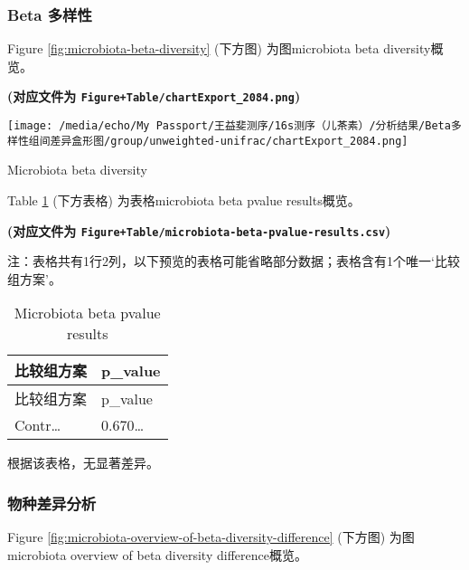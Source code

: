 \documentclass[
]{article}
\begin{document}
\hypertarget{beta-ux591aux6837ux6027}{%
\subsubsection{Beta 多样性}\label{beta-ux591aux6837ux6027}}

Figure \ref{fig:microbiota-beta-diversity} (下方图) 为图microbiota beta diversity概览。

\textbf{(对应文件为 \texttt{Figure+Table/chartExport\_2084.png})}

\def\@captype{figure}
\begin{center}
\texttt{[image: /media/echo/My Passport/王益斐测序/16s测序（儿茶素）/分析结果/Beta多样性组间差异盒形图/group/unweighted-unifrac/chartExport\_2084.png]}
\caption{Microbiota beta diversity}\label{fig:microbiota-beta-diversity}
\end{center}

Table \ref{tab:microbiota-beta-pvalue-results} (下方表格) 为表格microbiota beta pvalue results概览。

\textbf{(对应文件为 \texttt{Figure+Table/microbiota-beta-pvalue-results.csv})}

\begin{center}\begin{tcolorbox}[colback=gray!10, colframe=gray!50, width=0.9\linewidth, arc=1mm, boxrule=0.5pt]注：表格共有1行2列，以下预览的表格可能省略部分数据；表格含有1个唯一`比较组方案'。
\end{tcolorbox}
\end{center}

\begin{longtable}[]{@{}ll@{}}
\caption{\label{tab:microbiota-beta-pvalue-results}Microbiota beta pvalue results}\tabularnewline
\toprule
比较组方案 & p\_value\tabularnewline
\midrule
\endfirsthead
\toprule
比较组方案 & p\_value\tabularnewline
\midrule
\endhead
Contr\ldots{} & 0.670\ldots{}\tabularnewline
\bottomrule
\end{longtable}

根据该表格，无显著差异。

\hypertarget{ux7269ux79cdux5deeux5f02ux5206ux6790}{%
\subsubsection{物种差异分析}\label{ux7269ux79cdux5deeux5f02ux5206ux6790}}

Figure \ref{fig:microbiota-overview-of-beta-diversity-difference} (下方图) 为图microbiota overview of beta diversity difference概览。
\end{document}
